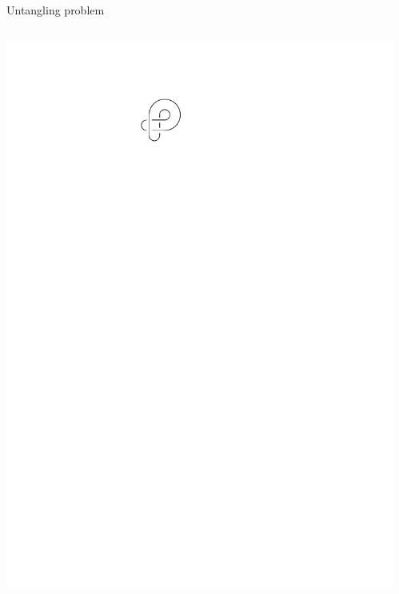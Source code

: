 \documentclass[11pt,xcolor=dvipsnames,presentation,aspectratio=169]{beamer}
\begin{document}
\begin{frame}{Untangling problem}
  \begin{columns}
    \begin{column}{.25\textwidth}
      \centering
      \includegraphics[width=.5\textwidth]{diagram_example.pdf}
    \end{column}
    \begin{column}{.75\textwidth}
      \centering
    \end{column}
  \end{columns}


\end{frame}
\end{document}

